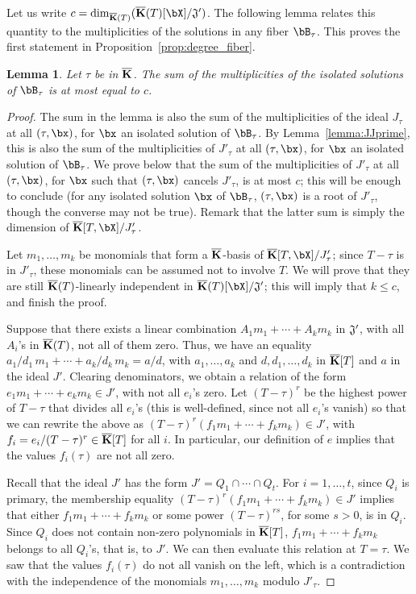 \documentclass[12pt]{article}
\newtheorem{lemma}[definition]{Lemma}
\begin{document}
Let us write $c=\dim_{\KKbar(T)}(\KKbar(T)[\bX]/{\frak J}')$.  The
following lemma relates this quantity to the multiplicities of the
solutions in any fiber $\bB_\tau$. This proves the first statement
in Proposition~\ref{prop:degree_fiber}.

\begin{lemma}\label{lemma:19}
  Let $\tau$ be in $\overline{\mathbf{K}}$. The sum of the multiplicities of the
  isolated solutions of $\bB_\tau$ is at most equal to $c$.
\end{lemma}
\begin{proof}
  The sum in the lemma is also the sum of the multiplicities of the
  ideal $J_\tau$ at all $(\tau,\bx)$, for $\bx$ an isolated solution
  of $\bB_\tau$.  By Lemma~\ref{lemma:JJprime}, this is also the sum
  of the multiplicities of $J'_\tau$ at all $(\tau,\bx)$, for $\bx$ an
  isolated solution of $\bB_\tau$. We prove below that the sum of the
  multiplicities of $J'_\tau$ at all $(\tau,\bx)$, for $\bx$ such that
  $(\tau,\bx)$ cancels $J'_\tau$, is at most $c$; this will be enough
  to conclude (for any isolated solution $\bx$ of $\bB_\tau$,
  $(\tau,\bx)$ is a root of $J'_\tau$, though the converse may not be
  true). Remark that the latter sum is simply the dimension of
  $\KKbar[T,\bX]/J'_\tau$.
  
  Let $m_1,\dots,m_k$ be monomials that form a $\overline{\mathbf{K}}$-basis of
  $\KKbar[T,\bX]/J'_\tau$; since $T-\tau$ is in $J'_\tau$, these
  monomials can be assumed not to involve $T$.  We will prove that
  they are still $\overline{\mathbf{K}}(T)$-linearly independent in
  $\KKbar(T)[\bX]/{\frak J}'$; this will imply that $k \le c$,
  and finish the proof.
  
  Suppose that there exists a linear combination $A_1 m_1 + \cdots +
  A_k m_k$ in ${\frak J}'$, with all $A_i$'s in $\overline{\mathbf{K}}(T)$, not
  all of them zero. Thus, we have an equality $a_1/d_1\, m_1 + \cdots
  + a_k/d_k\, m_k = a/d$, with $a_1,\dots,a_k$ and
  $d,d_1,\dots,d_k$ in $\overline{\mathbf{K}}[T]$ and $a$ in the ideal
  $J'$. Clearing denominators, we obtain a relation of the form $e_1
  m_1 +\cdots+ e_k m_k \in J'$, with not all $e_i$'s zero. Let
  $(T-\tau)^r$ be the highest power of $T-\tau$ that divides all
  $e_i$'s (this is well-defined, since not all $e_i$'s vanish) so that
  we can rewrite the above as $(T-\tau)^r (f_1 m_1 +\cdots+ f_k
  m_k) \in J'$, with $f_i=e_i/(T-\tau)^r \in \overline{\mathbf{K}}[T]$ for all $i$.
  In particular, our definition of $e$ implies that the values
  $f_i(\tau)$ are not all zero.

  Recall that the ideal $J'$ has the form $J'=Q_1 \cap \cdots \cap
  Q_t$. For $i=1,\dots,t$, since $Q_i$ is primary, the membership
  equality $(T-\tau)^r (f_1 m_1 +\cdots +f_k m_k) \in J'$ implies
  that either $f_1 m_1 +\cdots +f_k m_k$ or some power
  $(T-\tau)^{rs}$, for some $s > 0$, is in $Q_i$. Since $Q_i$ does not
  contain non-zero polynomials in $\overline{\mathbf{K}}[T]$, $f_1 m_1 +\cdots+ f_k
  m_k$ belongs to all $Q_i$'s, that is, to $J'$. We can then
  evaluate this relation at $T=\tau$. We saw that the values
  $f_i(\tau)$ do not all vanish on the left, which is a contradiction
  with the independence of the monomials $m_1,\dots,m_k$ modulo
  $J'_\tau$.
\end{proof}
\end{document}
